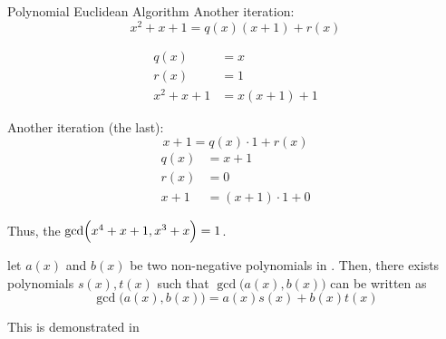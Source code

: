 \begin{example}[Lecture 3]{Polynomial Euclidean Algorithm}
    Another iteration:
    \begin{equation*}
      x^{2} + x + 1 = q(x) (x+1) + r(x)
    \end{equation*}
    \begin{center}
    \end{center}
    \begin{align*}
      q(x) &= x \\
      r(x) &= 1 \\
      x^{2} + x + 1 &= x (x+1) + 1
    \end{align*}

    Another iteration (the last):
    \begin{equation*}
      x+1 = q(x) \cdot 1 + r(x)
    \end{equation*}
    \begin{align*}
      q(x) &= x+1 \\
      r(x) &= 0 \\
      x+1 &= (x+1) \cdot 1 + 0
    \end{align*}

    Thus, the $\gcd \Bigl( x^{4} + x + 1, x^{3} + x \Bigr) = 1$.
\end{example}

\begin{definition}\label{def:Polynomial_Extended_Euclidean_Algorithm}
  let $a(x)$ and $b(x)$ be two non-negative polynomials in .
  Then, there exists polynomials $s(x), t(x)$ such that $\gcd \bigl( a(x), b(x) \bigr)$ can be written as
  \begin{equation}\label{eq:Polynomial_Extended_Euclidean_Algorithm}
    \gcd \bigl( a(x), b(x) \bigr) = a(x) s(x) + b(x) t(x)
  \end{equation}

  This is demonstrated in 
\end{definition}

